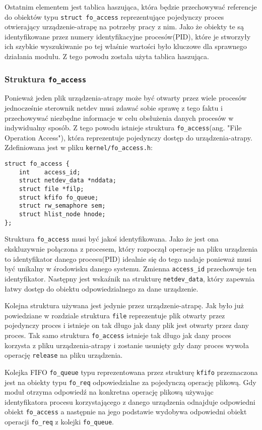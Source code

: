 \documentclass[10pt]{scrartcl}
\begin{document}
Ostatnim elementem jest tablica haszująca, która będzie przechowywać referencje do obiektów typu \texttt{struct fo\_access} reprezentujące pojedynczy proces otwierający urządzenie-atrapę na potrzeby pracy z nim.  Jako że obiekty te są identyfikowane przez numery identyfikacyjne procesów(PID), które je stworzyły ich szybkie wyszukiwanie po tej właśnie wartości było kluczowe dla sprawnego działania modułu. Z tego powodu została użyta tablica haszująca.

\subsubsection{Struktura \texttt{\large{fo\_access}}}

Ponieważ jeden plik urządzenia-atrapy może być otwarty przez wiele procesów jednocześnie sterownik netdev musi zdawać sobie sprawę z tego faktu i przechowywać niezbędne informacje w celu obsłużenia danych procesów w indywidualny sposób. Z tego powodu istnieje struktura \texttt{fo\_access}(ang. "File Operation Access"), która reprezentuje pojedynczy dostęp do urządzenia-atrapy. Zdefiniowana jest w pliku \texttt{kernel/fo\_access.h}:

\begin{verbatim}
struct fo_access {
    int    access_id;
    struct netdev_data *nddata;
    struct file *filp;
    struct kfifo fo_queue;
    struct rw_semaphore sem;
    struct hlist_node hnode;
};
\end{verbatim}

Struktura \texttt{fo\_access} musi być jakoś identyfikowana. Jako że jest ona ekskluzywnie połączona z procesem, który rozpoczął operacje na pliku urządzenia to identyfikator danego procesu(PID) idealnie się do tego nadaje ponieważ musi być unikalny w środowisku danego systemu.  Zmienna \texttt{access\_id} przechowuje ten identyfikator. Następny jest wskaźnik na strukturę \texttt{netdev\_data}, który zapewnia łatwy dostęp do obiektu odpowiedzialnego za dane urządzenie.

Kolejna struktura używana jest jedynie przez urządzenie-atrapę. Jak było już powiedziane w rozdziale  struktura \texttt{file} reprezentuje plik otwarty przez pojedynczy proces i istnieje on tak długo jak dany plik jest otwarty przez dany proces. Tak samo struktura \texttt{fo\_access} istnieje tak długo jak dany proces korzysta z pliku urządzenia-atrapy i zostanie usunięty gdy dany proces wywoła operację \texttt{release} na pliku urządzenia.

Kolejka FIFO \texttt{fo\_queue} typu reprezentowana przez strukturę \texttt{kfifo} przeznaczona jest na obiekty typu \texttt{fo\_req} odpowiedzialne za pojedynczą operację plikową. Gdy moduł otrzyma odpowiedź na konkretna operację plikową używając identyfikatora procesu korzystającego z danego urządzenia odnajduje odpowiedni obiekt \texttt{fo\_access} a następnie na jego podstawie wydobywa odpowiedni obiekt operacji \texttt{fo\_req} z kolejki \texttt{fo\_queue}.
\end{document}
